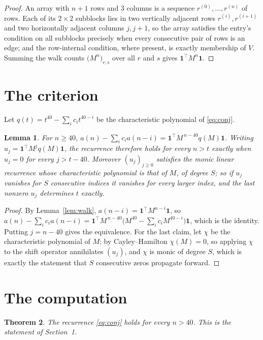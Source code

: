 \documentclass[11pt,a4paper]{article}
\theoremstyle{plain}
\newtheorem{theorem}{Theorem}
\newtheorem{lemma}[theorem]{Lemma}
\theoremstyle{definition}
\begin{document}
\begin{proof}
An array with $n+1$ rows and $3$ columns is a sequence $r^{(0)},\dots,r^{(n)}$ of
rows. Each of its $2\times2$ subblocks lies in two vertically adjacent rows
$r^{(i)},r^{(i+1)}$ and two horizontally adjacent columns $j,j+1$, so the array satisfies
the entry's condition on all subblocks precisely when every consecutive pair of rows is an
edge; and the row-internal condition, where present, is exactly membership of $V$. Summing
the walk counts $\bigl(M^{n}\bigr)_{r,s}$ over all $r$ and $s$ gives
$\mathbf{1}^{\!\top}M^{n}\mathbf{1}$.
\end{proof}

\section{The criterion}

Let $q(t)=t^{40}-\sum_i c_i t^{40-i}$ be the characteristic polynomial of
\eqref{eq:conj}.

\begin{lemma}\label{lem:crit}
For $n\ge40$,
$a(n)-\sum_i c_i a(n-i)=\mathbf{1}^{\!\top}M^{\,n-40}q(M)\mathbf{1}$. Writing
$u_j=\mathbf{1}^{\!\top}M^{j}q(M)\mathbf{1}$, the recurrence therefore holds for every
$n>t$ exactly when $u_j=0$ for every $j>t-40$. Moreover $(u_j)_{j\ge0}$ satisfies the
monic linear recurrence whose characteristic polynomial is that of $M$, of degree $S$; so
if $u_j$ vanishes for $S$ consecutive indices it vanishes for every larger index, and the
last nonzero $u_j$ determines $t$ exactly.
\end{lemma}

\begin{proof}
By Lemma~\ref{lem:walk}, $a(n-i)=\mathbf{1}^{\!\top}M^{n-i}\mathbf{1}$, so
$a(n)-\sum_i c_i a(n-i)
=\mathbf{1}^{\!\top}M^{\,n-40}\bigl(M^{40}-\sum_i c_i M^{40-i}\bigr)
\mathbf{1}$, which is the identity. Putting $j=n-40$ gives the equivalence. For the
last claim, let $\chi$ be the characteristic polynomial of $M$; by Cayley--Hamilton
$\chi(M)=0$, so applying $\chi$ to the shift operator annihilates $(u_j)$, and $\chi$ is
monic of degree $S$, which is exactly the statement that $S$ consecutive zeros propagate
forward.
\end{proof}

\section{The computation}

\begin{theorem}
The recurrence \eqref{eq:conj} holds for every $n>40$. This is the statement of
Section~1.
\end{theorem}
\end{document}
